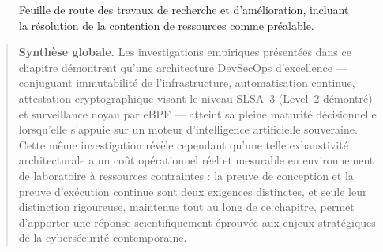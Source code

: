 \begin{figure}[H]
\centering
\scriptsize
{}
\caption{Feuille de route des travaux de recherche et d'amélioration, incluant la résolution de la contention de ressources comme préalable.}
\label{fig:perspectives_amelioration_full_sec}
\end{figure}

\begin{quote}
\textbf{Synthèse globale.} Les investigations empiriques présentées dans ce chapitre démontrent qu'une architecture DevSecOps d'excellence — conjuguant immutabilité de l'infrastructure, automatisation continue, attestation cryptographique visant le niveau SLSA~3 (Level~2 démontré) et surveillance noyau par eBPF — atteint sa pleine maturité décisionnelle lorsqu'elle s'appuie sur un moteur d'intelligence artificielle souveraine. Cette même investigation révèle cependant qu'une telle exhaustivité architecturale a un coût opérationnel réel et mesurable en environnement de laboratoire à ressources contraintes : la preuve de conception et la preuve d'exécution continue sont deux exigences distinctes, et seule leur distinction rigoureuse, maintenue tout au long de ce chapitre, permet d'apporter une réponse scientifiquement éprouvée aux enjeux stratégiques de la cybersécurité contemporaine.
\end{quote}